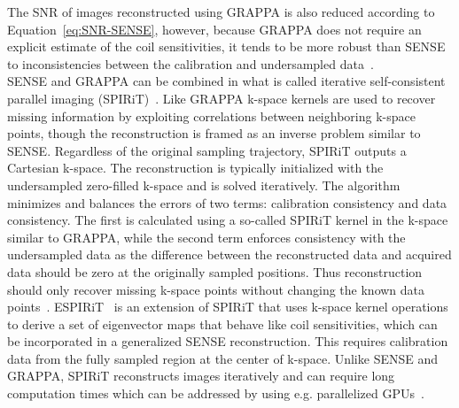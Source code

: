 \documentclass[english,version-2022-01]{uzl-thesis} %
\begin{document}
The SNR of images reconstructed using GRAPPA is also reduced according to Equation~\ref{eq:SNR-SENSE}, however, because GRAPPA does not require an explicit estimate of the coil sensitivities, it tends to be more robust than SENSE to inconsistencies between the calibration and undersampled data~\cite{AdvancesPI}.\\
SENSE and GRAPPA can be combined in what is called iterative self-consistent parallel imaging (SPIRiT)~\cite{SPIRiT}. Like GRAPPA k-space kernels are used to recover missing information by exploiting correlations between neighboring k-space points, though the reconstruction is framed as an inverse problem similar to SENSE. Regardless of the original sampling trajectory, SPIRiT outputs a Cartesian k-space. The reconstruction is typically initialized with the undersampled zero-filled k-space and is solved iteratively. 
The algorithm 
minimizes and balances the errors of two terms: calibration consistency and data consistency. The first is calculated using a so-called SPIRiT kernel in the k-space similar to GRAPPA, while the second term enforces consistency with the undersampled data as the difference between the reconstructed data and acquired data should be zero at the originally sampled positions. Thus reconstruction should only recover missing k-space points without changing the known data points~\cite{AdvancesPI}.%
ESPIRiT~\cite{ESPIRiT} is an extension of SPIRiT that uses k-space kernel operations to derive a set of eigenvector maps that behave like coil sensitivities, which can be incorporated in a generalized SENSE reconstruction. This requires calibration data from the fully sampled region at the center of k-space. 
Unlike SENSE and GRAPPA, SPIRiT reconstructs images iteratively and can require long computation times which can be addressed by using e.g. parallelized GPUs~\cite{AdvancesPI}.
\end{document}
